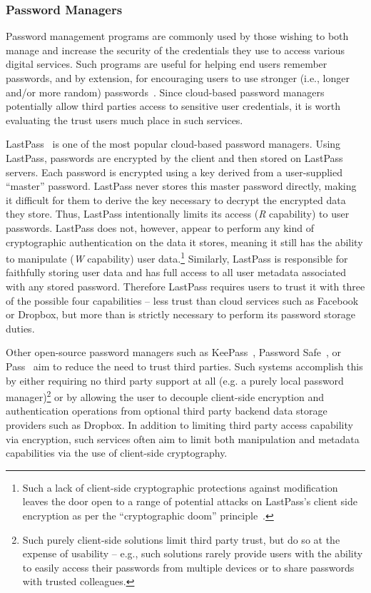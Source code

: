 \subsubsection{Password Managers}

Password management programs are commonly used by those wishing to
both manage and increase the security of the credentials they use to
access various digital services. Such programs are useful for helping
end users remember passwords, and by extension, for encouraging users
to use stronger (i.e., longer and/or more random)
passwords~\cite{brodkin-passman, krebs-passwords,
  schneier-passwords}. Since cloud-based password managers potentially
allow third parties access to sensitive user credentials, it is worth
evaluating the trust users much place in such services.

LastPass~\cite{lastpass} is one of the most popular cloud-based
password managers. Using LastPass, passwords are encrypted by the
client and then stored on LastPass servers. Each password is encrypted
using a key derived from a user-supplied ``master'' password. LastPass
never stores this master password directly, making it difficult for
them to derive the key necessary to decrypt the encrypted data they
store. Thus, LastPass intentionally limits its access (\emph{R}
capability) to user passwords. LastPass does not, however, appear to
perform any kind of cryptographic authentication on the data it
stores, meaning it still has the ability to manipulate (\emph{W}
capability) user data.\footnote{Such a lack of client-side
  cryptographic protections against modification leaves the door open
  to a range of potential attacks on LastPass's client side encryption
  as per the ``cryptographic doom''
  principle~\cite{marlinspike-doom}.} Similarly, LastPass is
responsible for faithfully storing user data and has full access to
all user metadata associated with any stored password. Therefore
LastPass requires users to trust it with three of the possible four
capabilities -- less trust than cloud services such as Facebook or
Dropbox, but more than is strictly necessary to perform its password
storage duties.

Other open-source password managers such as KeePass~\cite{keepass},
Password Safe~\cite{passwordsafe}, or Pass~\cite{pass} aim to reduce
the need to trust third parties. Such systems accomplish this by
either requiring no third party support at all (e.g. a purely local
password manager)\footnote{Such purely client-side solutions limit
  third party trust, but do so at the expense of usability -- e.g.,
  such solutions rarely provide users with the ability to easily
  access their passwords from multiple devices or to share passwords
  with trusted colleagues.} or by allowing the user to decouple
client-side encryption and authentication operations from optional
third party backend data storage providers such as Dropbox. In
addition to limiting third party access capability via encryption,
such services often aim to limit both manipulation and metadata
capabilities via the use of client-side cryptography.

